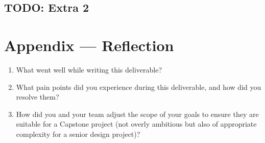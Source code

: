 \documentclass{article}
\begin{document}
\subsection{TODO: Extra 2}


\newpage{}

\section*{Appendix --- Reflection}




\begin{enumerate}
    \item What went well while writing this deliverable? 
    \item What pain points did you experience during this deliverable, and how
    did you resolve them?
    \item How did you and your team adjust the scope of your goals to ensure
    they are suitable for a Capstone project (not overly ambitious but also of
    appropriate complexity for a senior design project)?
\end{enumerate}  
\end{document}
